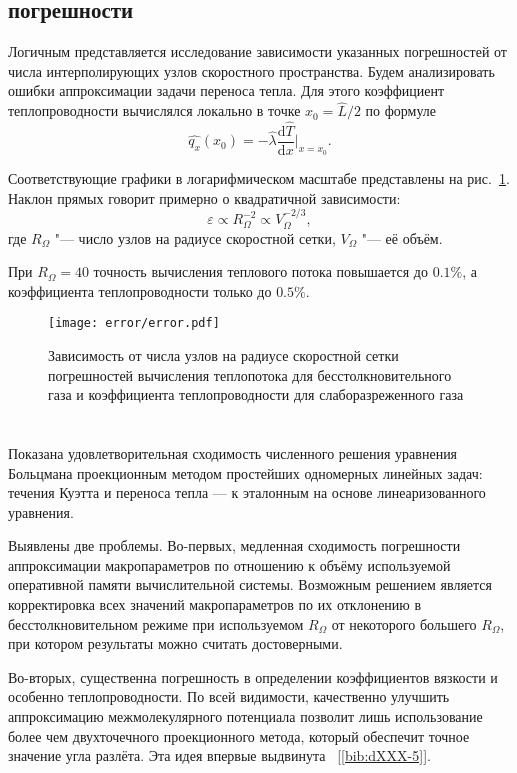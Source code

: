 \documentclass[english,russian,a4paper,12pt]{article}
\newcommand{\D}{\mathrm{d}}
\begin{document}
\subsection*{ погрешности}

Логичным представляется исследование зависимости указанных погрешностей от числа интерполирующих узлов
скоростного пространства. Будем анализировать ошибки аппроксимации задачи переноса тепла.
Для этого коэффициент теплопроводности вычислялся локально в точке \(x_0=\hat L/2\) по формуле
\[ \hat{q_x}(x_0) = -\hat{\lambda}\frac{\D\hat T}{\D x}\bigg|_{x=x_0}. \]

Соответствующие графики в логарифмическом масштабе представлены на рис.~\ref{fig:error}.
Наклон прямых говорит примерно о квадратичной зависимости:
\[ \varepsilon \propto R_\Omega^{-2} \propto V_\Omega^{-2/3}, \]
где \(R_\Omega\) "--- число узлов на радиусе скоростной сетки, \(V_\Omega\) "--- её объём.

При \(R_\Omega = 40\) точность вычисления теплового потока повышается до \(0.1\%\),
а коэффициента теплопроводности только до \(0.5\%\).

\begin{figure}
	\centering
	\texttt{[image: error/error.pdf]}
	\caption{
		Зависимость от числа узлов на радиусе скоростной сетки погрешностей вычисления 
		теплопотока для бесстолкновительного газа и коэффициента теплопроводности для слаборазреженного газа
	}\label{fig:error}
\end{figure}

\section*{}

Показана удовлетворительная сходимость численного решения уравнения Больцмана проекционным методом
простейших одномерных линейных задач: течения Куэтта и переноса тепла --- к эталонным на основе
линеаризованного уравнения.

Выявлены две проблемы. Во-первых, медленная сходимость погрешности аппроксимации макропараметров по отношению к
объёму используемой оперативной памяти вычислительной системы. Возможным решением является корректировка всех значений макропараметров
по их отклонению в бесстолкновительном режиме при используемом \(R_\Omega\) от некоторого большего \(R_\Omega\),
при котором результаты можно считать достоверными.

Во-вторых, существенна погрешность в определении коэффициентов вязкости и особенно теплопроводности.
По всей видимости, качественно улучшить аппроксимацию межмолекулярного потенциала позволит лишь использование
более чем двухточечного проекционного метода, который обеспечит точное значение угла разлёта.
Эта идея впервые выдвинута ~[\ref{bib:dXXX-5}].
\end{document}
